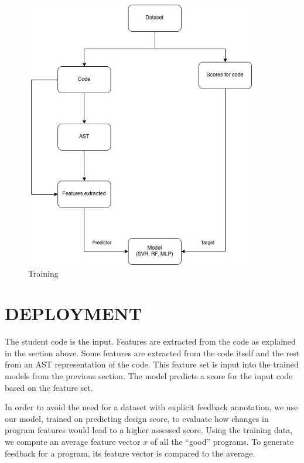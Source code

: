 \begin{figure}[h]
\centering
\includegraphics[width=0.9\textwidth]{./training.jpg}
\caption{Training}
\label{fig1}
\end{figure}

\newpage

\section{DEPLOYMENT} 

The student code is the input. Features are extracted from the code as
explained in the section above. Some features are extracted from the
code itself and the rest from an AST representation of the code. This
feature set is input into the trained models from the previous
section. The model predicts a score for the input code based on the
feature set.

In order to avoid the need for a dataset with explicit feedback
annotation, we use our model, trained on predicting design score, to
evaluate how changes in program features would lead to a higher
assessed score. Using the training data, we compute an average feature
vector $x$ of all the ``good'' programs. To generate feedback for a
program, its feature vector is compared to the average.

